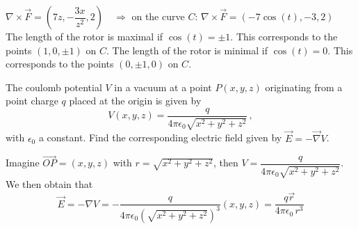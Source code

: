 \begin{Answer}

    $\nabla \times \vec F = \left(7z, -\dfrac{3x}{z^2}, 2 \right) \quad \Rightarrow$ on the curve $C$: $\nabla \times \vec F=\left( -7 \cos(t), -3, 2 \right) $ \\[0.2cm]
    The length of the rotor is maximal if $\cos(t) = \pm 1$. This corresponds to the points $(1,0, \pm 1)$ on $C$. The length of the rotor is minimal if $\cos(t) = 0$. This corresponds to the points $(0, \pm 1, 0) $ on $C$.
\end{Answer}

\begin{Exercise}[difficulty = 3] The coulomb potential $V$ in a vacuum at a point $P(x,y,z)$ originating from a point charge $q$ placed at the origin is given by
\[ V(x,y,z) = \dfrac{q}{4\pi\epsilon_0 \sqrt{x^2+y^2+z^2}}\,, \]
with $\epsilon_0$ a constant. Find the corresponding electric field given by $\vec E = -\vec{\nabla} V$.
\end{Exercise}

\begin{Answer}

    Imagine $\overrightarrow{OP} = (x,y,z)$ with $r=\sqrt{x^2+y^2+z^2}$, then $V = \dfrac{q}{4\pi\epsilon_0 \sqrt{x^2+y^2+z^2}}$. We then obtain that
\[ \vec E = -\nabla V = -\dfrac{q}{4\pi\epsilon_0 \left(\sqrt{x^2+y^2+z^2}\right)^3}(x,y,z) = \dfrac{q \vec r}{4\pi\epsilon_0\, r^3} \]
\end{Answer}

\pagebreak
